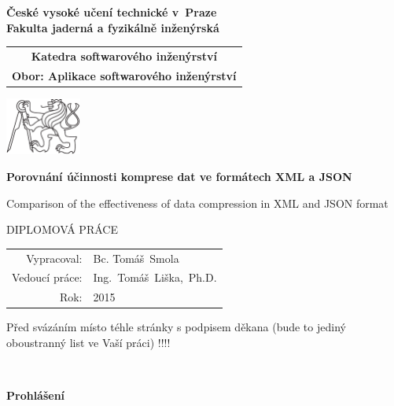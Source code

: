 \documentclass[a4paper,11pt]{report}
\newcommand{\cvut}{České vysoké učení technické v~Praze}
\newcommand{\fjfi}{Fakulta jaderná a fyzikálně inženýrská}
\newcommand{\kse}{Katedra softwarového inženýrství}
\newcommand{\obor}{Aplikace softwarového inženýrství}
\newcommand{\nazevcz}{Porovnání účinnosti komprese dat ve formátech XML a JSON}        %
\newcommand{\nazeven}{Comparison of the effectiveness of data compression in XML and JSON format}     %
\newcommand{\autor}{Bc. Tomáš~Smola}           %
\newcommand{\rok}{2015}                %
\newcommand{\vedouci}{Ing.~Tomáš~Liška,~Ph.D.}         %
\begin{document}
\thispagestyle{empty}

\begin{center}
    {\Large \bf \cvut\\[2mm] \fjfi }
    \vspace{10mm}

    \begin{tabular}{c}
    {\bf \kse}\\
    {\bf Obor: \obor}\\
    \end{tabular}


   \vspace{10mm} \includegraphics[angle=0, width=25mm]{cvut-logo-bw} \vspace{15mm}

   {\Huge \bf \nazevcz\par \vspace{5mm} \nazeven }

   \vspace{15mm}
   {\Large DIPLOMOVÁ PRÁCE}

   \vfill
   {\large
    \begin{tabular}{rl}
    Vypracoval: & \autor\\
    Vedoucí práce: & \vedouci\\
    Rok: & \rok
    \end{tabular}
   }
\end{center}

\newpage  %
\thispagestyle{empty} Před svázáním místo téhle stránky  s podpisem
děkana (bude to jediný oboustranný list ve Vaší práci) !!!!

\newpage %
\thispagestyle{empty}  %

~ %
\vfill %

{\bf Prohlášení} %
\end{document}
